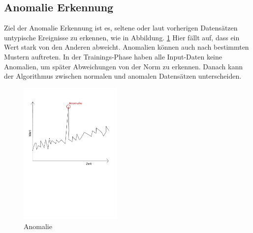 	 \subsection{Anomalie Erkennung}
	 Ziel der Anomalie Erkennung ist es, seltene oder laut vorherigen Datensätzen untypische Ereignisse zu erkennen, wie in Abbildung. \ref{fig:abb4} Hier fällt auf, dass ein Wert stark von den Anderen abweicht. \newline
	 Anomalien können auch nach bestimmten Mustern auftreten. In der Trainings-Phase haben alle Input-Daten keine Anomalien, um später Abweichungen von der Norm zu erkennen. Danach kann der Algorithmus zwischen normalen und anomalen Datensätzen unterscheiden. \cite{Sarkar2018}
	 \begin{figure}[h!]
	 	\centering
	 	\includegraphics[width=5cm]{Bilder/Anomalie.pdf}
	 	\caption{Anomalie}
	 	\label{fig:abb4}
	 \end{figure}
	 
